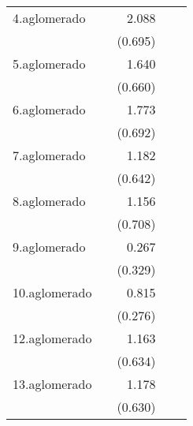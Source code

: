 {\begin{longtable}{l*{4}{D{.}{.}{-1}}}
\addlinespace
4.aglomerado&                     &       2.088\sym{**} &                     &                     \\
            &                     &     (0.695)         &                     &                     \\
\addlinespace
5.aglomerado&                     &       1.640\sym{*}  &                     &                     \\
            &                     &     (0.660)         &                     &                     \\
\addlinespace
6.aglomerado&                     &       1.773\sym{*}  &                     &                     \\
            &                     &     (0.692)         &                     &                     \\
\addlinespace
7.aglomerado&                     &       1.182         &                     &                     \\
            &                     &     (0.642)         &                     &                     \\
\addlinespace
8.aglomerado&                     &       1.156         &                     &                     \\
            &                     &     (0.708)         &                     &                     \\
\addlinespace
9.aglomerado&                     &       0.267         &                     &                     \\
            &                     &     (0.329)         &                     &                     \\
\addlinespace
10.aglomerado&                     &       0.815\sym{**} &                     &                     \\
            &                     &     (0.276)         &                     &                     \\
\addlinespace
12.aglomerado&                     &       1.163         &                     &                     \\
            &                     &     (0.634)         &                     &                     \\
\addlinespace
13.aglomerado&                     &       1.178         &                     &                     \\
            &                     &     (0.630)         &                     &                     \\

\end{longtable}}
